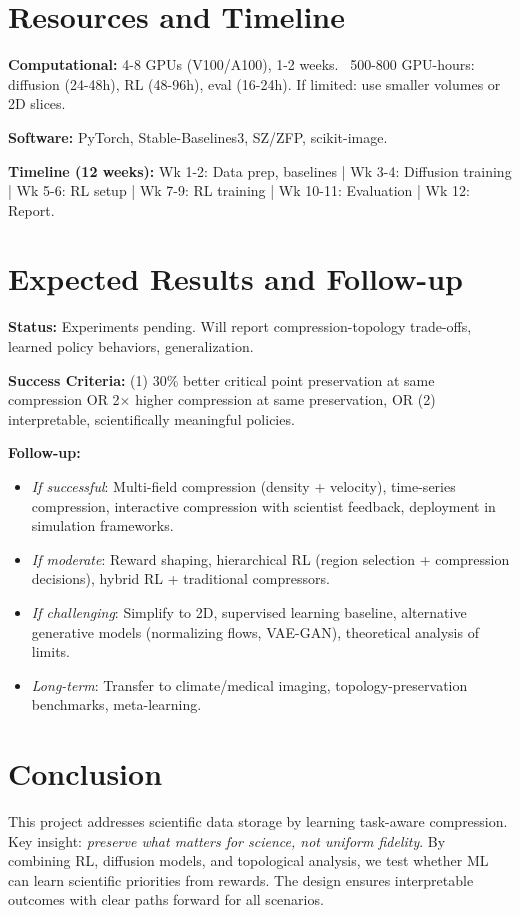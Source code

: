 \documentclass[11pt]{article}
\begin{document}
\section{Resources and Timeline}

\textbf{Computational:} 4-8 GPUs (V100/A100), 1-2 weeks. ~500-800 GPU-hours: diffusion (24-48h), RL (48-96h), eval (16-24h). If limited: use smaller volumes or 2D slices.

\textbf{Software:} PyTorch, Stable-Baselines3, SZ/ZFP, scikit-image.

\textbf{Timeline (12 weeks):} Wk 1-2: Data prep, baselines | Wk 3-4: Diffusion training | Wk 5-6: RL setup | Wk 7-9: RL training | Wk 10-11: Evaluation | Wk 12: Report.

\section{Expected Results and Follow-up}

\textbf{Status:} Experiments pending. Will report compression-topology trade-offs, learned policy behaviors, generalization.

\textbf{Success Criteria:} (1) 30\% better critical point preservation at same compression OR 2$\times$ higher compression at same preservation, OR (2) interpretable, scientifically meaningful policies.

\textbf{Follow-up:}
\begin{itemize}
    \item \textit{If successful}: Multi-field compression (density + velocity), time-series compression, interactive compression with scientist feedback, deployment in simulation frameworks.
    \item \textit{If moderate}: Reward shaping, hierarchical RL (region selection + compression decisions), hybrid RL + traditional compressors.
    \item \textit{If challenging}: Simplify to 2D, supervised learning baseline, alternative generative models (normalizing flows, VAE-GAN), theoretical analysis of limits.
    \item \textit{Long-term}: Transfer to climate/medical imaging, topology-preservation benchmarks, meta-learning.
\end{itemize}

\section{Conclusion}

This project addresses scientific data storage by learning task-aware compression. Key insight: \textit{preserve what matters for science, not uniform fidelity}. By combining RL, diffusion models, and topological analysis, we test whether ML can learn scientific priorities from rewards. The design ensures interpretable outcomes with clear paths forward for all scenarios.
\end{document}
